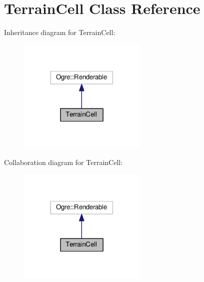 \hypertarget{class_terrain_cell}{}\section{Terrain\+Cell Class Reference}
\label{class_terrain_cell}


Inheritance diagram for Terrain\+Cell\+:\nopagebreak
\begin{figure}[H]
\begin{center}
\leavevmode
\includegraphics[width=173pt]{class_terrain_cell__inherit__graph}
\end{center}
\end{figure}


Collaboration diagram for Terrain\+Cell\+:\nopagebreak
\begin{figure}[H]
\begin{center}
\leavevmode
\includegraphics[width=173pt]{class_terrain_cell__coll__graph}
\end{center}
\end{figure}
